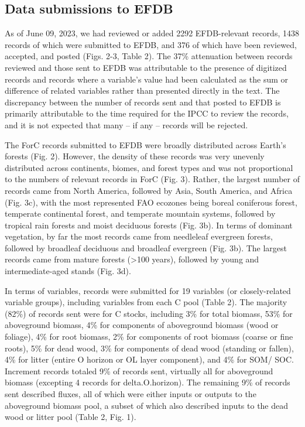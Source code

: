 \documentclass[, manuscript]{copernicus}
\begin{document}
\endgroup{}

\subsection{Data submissions to EFDB}

As of June 09, 2023, we had reviewed or added 2292 EFDB-relevant
records, 1438 records of which were submitted to EFDB, and 376 of which
have been reviewed, accepted, and posted (Figs. 2-3, Table 2). The 37\%
attenuation between records reviewed and those sent to EFDB was
attributable to the presence of digitized records and records where a
variable's value had been calculated as the sum or difference of related
variables rather than presented directly in the text. The discrepancy
between the number of records sent and that posted to EFDB is primarily
attributable to the time required for the IPCC to review the records,
and it is not expected that many -- if any -- records will be rejected.

The ForC records submitted to EFDB were broadly distributed across
Earth's forests (Fig. 2). However, the density of these records was very
unevenly distributed across continents, biomes, and forest types and was
not proportional to the numbers of relevant records in ForC (Fig. 3).
Rather, the largest number of records came from North America, followed
by Asia, South America, and Africa (Fig. 3c), with the most represented
FAO ecozones being boreal coniferous forest, temperate continental
forest, and temperate mountain systems, followed by tropical rain
forests and moist deciduous forests (Fig. 3b). In terms of dominant
vegetation, by far the most records came from needleleaf evergreen
forests, followed by broadleaf deciduous and broadleaf evergreen (Fig.
3b). The largest records came from mature forests (\textgreater100
years), followed by young and intermediate-aged stands (Fig. 3d).

In terms of variables, records were submitted for 19 variables (or
closely-related variable groups), including variables from each C pool
(Table 2). The majority (82\%) of records sent were for C stocks,
including 3\% for total biomass, 53\% for aboveground biomass, 4\% for
components of aboveground biomass (wood or foliage), 4\% for root
biomass, 2\% for components of root biomass (coarse or fine roots), 5\%
for dead wood, 3\% for components of dead wood (standing or fallen), 4\%
for litter (entire O horizon or OL layer component), and 4\% for SOM/
SOC. Increment records totaled 9\% of records sent, virtually all for
aboveground biomass (excepting 4 records for delta.O.horizon). The
remaining 9\% of records sent described fluxes, all of which were either
inputs or outputs to the aboveground biomass pool, a subset of which
also described inputs to the dead wood or litter pool (Table 2, Fig. 1).
\end{document}
